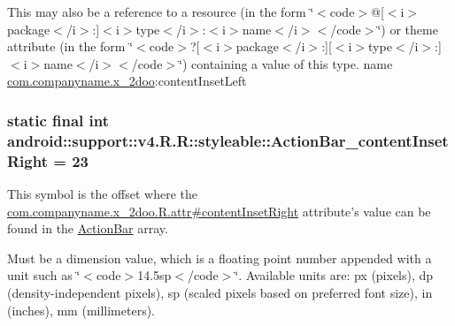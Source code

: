 This may also be a reference to a resource (in the form \char`\"{}$<$code$>$@\mbox{[}$<$i$>$package$<$/i$>$:\mbox{]}$<$i$>$type$<$/i$>$:$<$i$>$name$<$/i$>$$<$/code$>$\char`\"{}) or theme attribute (in the form \char`\"{}$<$code$>$?\mbox{[}$<$i$>$package$<$/i$>$:\mbox{]}\mbox{[}$<$i$>$type$<$/i$>$:\mbox{]}$<$i$>$name$<$/i$>$$<$/code$>$\char`\"{}) containing a value of this type.  name \hyperlink{namespacecom_1_1companyname_1_1x__2doo}{com.companyname.x\_\-2doo}:contentInsetLeft \hypertarget{classandroid_1_1support_1_1v4_1_1_r_1_1styleable_c4907643708a044aecdbc76049dc1be0}{
\subsubsection[{ActionBar\_\-contentInsetRight}]{\setlength{\rightskip}{0pt plus 5cm}static final int android::support::v4.R.R::styleable::ActionBar\_\-contentInsetRight = 23}}
\label{classandroid_1_1support_1_1v4_1_1_r_1_1styleable_c4907643708a044aecdbc76049dc1be0}


This symbol is the offset where the \hyperlink{classcom_1_1companyname_1_1x__2doo_1_1_r_1_1attr_3801fe95544dbee5dc1389c679f984f6}{com.companyname.x\_\-2doo.R.attr\#contentInsetRight} attribute's value can be found in the \hyperlink{classandroid_1_1support_1_1v4_1_1_r_1_1styleable_5c6cf2c83551ebae05f365bb913fdddf}{ActionBar} array.

Must be a dimension value, which is a floating point number appended with a unit such as \char`\"{}$<$code$>$14.5sp$<$/code$>$\char`\"{}. Available units are: px (pixels), dp (density-independent pixels), sp (scaled pixels based on preferred font size), in (inches), mm (millimeters). 

